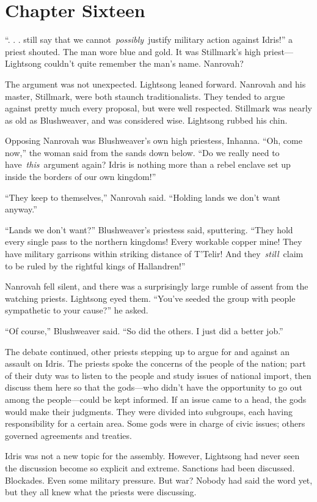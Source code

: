 \section{Chapter Sixteen}

“. . . still say that we cannot~\textit{possibly}~justify military action against Idris!” a priest shouted. The man wore blue and gold. It was Stillmark’s high priest—Lightsong couldn’t quite remember the man’s name. Nanrovah?

The argument was not unexpected. Lightsong leaned forward. Nanrovah and his master, Stillmark, were both staunch traditionalists. They tended to argue against pretty much every proposal, but were well respected. Stillmark was nearly as old as Blushweaver, and was considered wise. Lightsong rubbed his chin.

Opposing Nanrovah was Blushweaver’s own high priestess, Inhanna. “Oh, come now,” the woman said from the sands down below. “Do we really need to have~\textit{this}~argument again? Idris is nothing more than a rebel enclave set up inside the borders of our own kingdom!”

“They keep to themselves,” Nanrovah said. “Holding lands we don’t want anyway.”

“Lands we don’t want?” Blushweaver’s priestess said, sputtering. “They hold every single pass to the northern kingdoms! Every workable copper mine! They have military garrisons within striking distance of T’Telir! And they~\textit{still}~claim to be ruled by the rightful kings of Hallandren!”

Nanrovah fell silent, and there was a surprisingly large rumble of assent from the watching priests. Lightsong eyed them. “You’ve seeded the group with people sympathetic to your cause?” he asked.

“Of course,” Blushweaver said. “So did the others. I just did a better job.”

The debate continued, other priests stepping up to argue for and against an assault on Idris. The priests spoke the concerns of the people of the nation; part of their duty was to listen to the people and study issues of national import, then discuss them here so that the gods—who didn’t have the opportunity to go out among the people—could be kept informed. If an issue came to a head, the gods would make their judgments. They were divided into subgroups, each having responsibility for a certain area. Some gods were in charge of civic issues; others governed agreements and treaties.

Idris was not a new topic for the assembly. However, Lightsong had never seen the discussion become so explicit and extreme. Sanctions had been discussed. Blockades. Even some military pressure. But war? Nobody had said the word yet, but they all knew what the priests were discussing.

